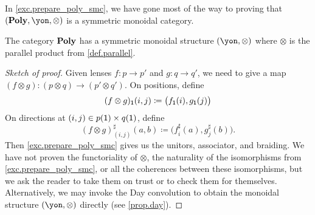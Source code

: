 \documentclass[Book-Poly]{subfiles}
\begin{document}
In \cref{exc.prepare_poly_smc}, we have gone most of the way to proving that $(\poly,\yon,\otimes)$ is a symmetric monoidal category. 

\begin{proposition}\label{prop.parallel_monoidal}
The category $\mathbf{Poly}$ has a symmetric monoidal structure $(\yon,\otimes)$ where $\otimes$ is the parallel product from \cref{def.parallel}.
\end{proposition}
\begin{proof}[Sketch of proof]
Given lenses $f\colon p\to p'$ and $g\colon q\to q'$, we need to give a map $(f\otimes g)\colon (p\otimes q)\to (p'\otimes q')$. On positions, define
\[
(f\otimes g)_{\textsf{1}}(i,j)\coloneqq \big(f_{\textsf{1}}(i),g_{\textsf{1}}(j)\big)
\]
On directions at $(i,j)\in p(\textsf{1})\times q(\textsf{1})$, define
\[
  (f\otimes g)^\sharp_{(i,j)}(a,b)\coloneqq
  \big(f^\sharp_i(a),g^\sharp_j(b)\big).
\]
Then \cref{exc.prepare_poly_smc} gives us the unitors, associator, and braiding.
We have not proven the functoriality of $\otimes$, the naturality of the isomorphisms from \cref{exc.prepare_poly_smc}, or all the coherences between these isomorphisms, but we ask the reader to take them on trust or to check them for themselves.
Alternatively, we may invoke the Day convolution to obtain the monoidal structure $(\yon, \otimes)$ directly (see \cref{prop.day}).
\end{proof}
\end{document}
